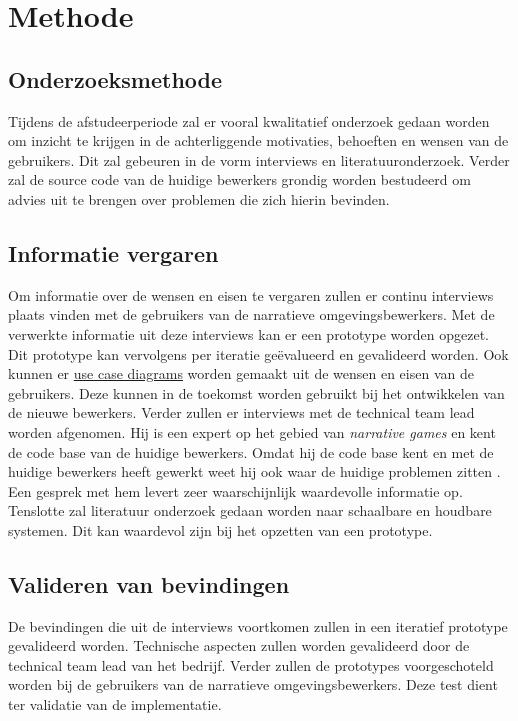\documentclass{report}
\begin{document}
\chapter{Methode}

\section{Onderzoeksmethode} %
Tijdens de afstudeerperiode zal er vooral kwalitatief onderzoek gedaan worden om inzicht te krijgen in de achterliggende motivaties, behoeften en wensen van de gebruikers. Dit zal gebeuren in de vorm interviews en literatuuronderzoek. Verder zal de source code van de huidige bewerkers grondig worden bestudeerd om advies uit te brengen over problemen die zich hierin bevinden. 

\section{Informatie vergaren}
Om informatie over de wensen en eisen te vergaren zullen er continu interviews plaats vinden met de gebruikers van de narratieve omgevingsbewerkers. Met de verwerkte informatie uit deze interviews kan er een prototype worden opgezet. Dit prototype kan vervolgens per iteratie ge{\"e}valueerd en gevalideerd worden. Ook kunnen er \href{http://www.agilemodeling.com/artifacts/useCaseDiagram.htm}{use case diagrams} worden gemaakt uit de wensen en eisen van de gebruikers. Deze kunnen in de toekomst worden gebruikt bij het ontwikkelen van de nieuwe bewerkers.
Verder zullen er interviews met de technical team lead worden afgenomen. Hij is een expert op het gebied van \emph{narrative games} en kent de code base van de huidige bewerkers. Omdat hij de code base kent en met de huidige bewerkers heeft gewerkt weet hij ook waar de huidige problemen zitten \cite{interviewivo}. Een gesprek met hem levert zeer waarschijnlijk waardevolle informatie op.
Tenslotte zal literatuur onderzoek gedaan worden naar schaalbare en houdbare systemen. Dit kan waardevol zijn bij het opzetten van een prototype.

\section{Valideren van bevindingen}
De bevindingen die uit de interviews voortkomen zullen in een iteratief prototype gevalideerd worden. Technische aspecten zullen worden gevalideerd door de technical team lead van het bedrijf. Verder zullen de prototypes voorgeschoteld worden bij de gebruikers van de narratieve omgevingsbewerkers. Deze test dient ter validatie van de implementatie.
\end{document}
